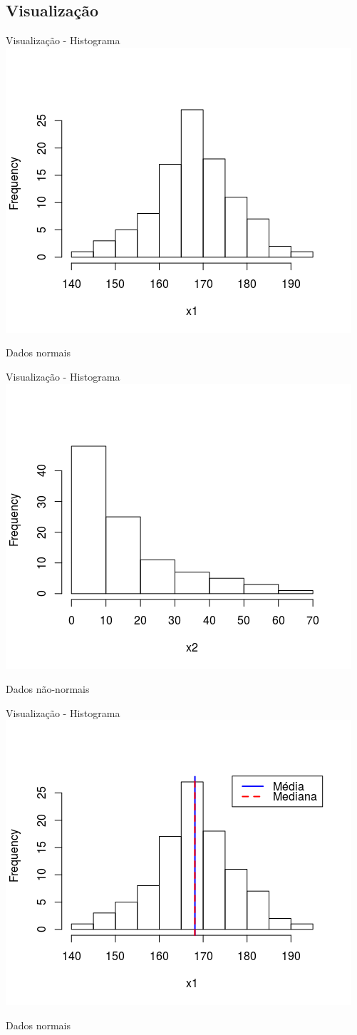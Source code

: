 \documentclass{beamer}
\begin{document}
\subsection{Visualização}

\begin{frame}{Visualização - Histograma}
  \centering
  \includegraphics[width=.7\textwidth]{Nao_Param/normal1-h}

  Dados normais
\end{frame}

\begin{frame}{Visualização - Histograma}
  \centering
  \includegraphics[width=.7\textwidth]{Nao_Param/lognormal1-h}

  Dados não-normais
\end{frame}

\begin{frame}{Visualização - Histograma}
  \centering
  \includegraphics[width=.7\textwidth]{Nao_Param/normal2-h}

  Dados normais
\end{frame}
\end{document}
